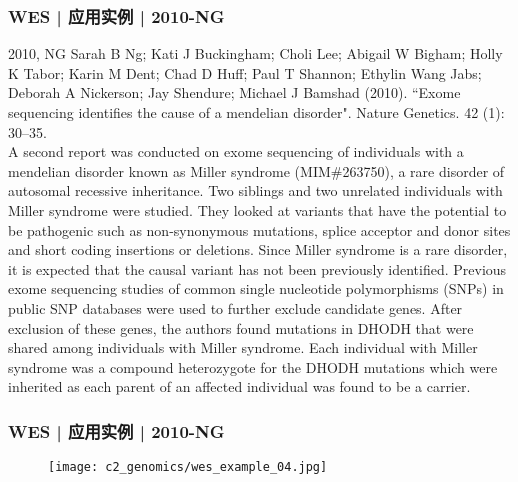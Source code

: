 \begin{frame}
  \frametitle{WES | 应用实例 | 2010-NG}
  \footnotesize{
    \begin{block}{2010, NG}
  Sarah B Ng; Kati J Buckingham; Choli Lee; Abigail W Bigham; Holly K Tabor; Karin M Dent; Chad D Huff; Paul T Shannon; Ethylin Wang Jabs; Deborah A Nickerson; Jay Shendure; Michael J Bamshad (2010). ``Exome sequencing identifies the cause of a mendelian disorder". Nature Genetics. 42 (1): 30–35.\\
  \vspace{1em}
  A second report was conducted on exome sequencing of individuals with a mendelian disorder known as Miller syndrome (MIM\#263750), a rare disorder of autosomal recessive inheritance. Two siblings and two unrelated individuals with Miller syndrome were studied. They looked at variants that have the potential to be pathogenic such as non-synonymous mutations, splice acceptor and donor sites and short coding insertions or deletions. Since Miller syndrome is a rare disorder, it is expected that the causal variant has not been previously identified. Previous exome sequencing studies of common single nucleotide polymorphisms (SNPs) in public SNP databases were used to further exclude candidate genes. After exclusion of these genes, the authors found mutations in DHODH that were shared among individuals with Miller syndrome. Each individual with Miller syndrome was a compound heterozygote for the DHODH mutations which were inherited as each parent of an affected individual was found to be a carrier.
    \end{block}
}
\end{frame}

\begin{frame}
  \frametitle{WES | 应用实例 | 2010-NG}
  \begin{figure}
    \centering
    \texttt{[image: c2\_genomics/wes\_example\_04.jpg]}
  \end{figure}
\end{frame}


